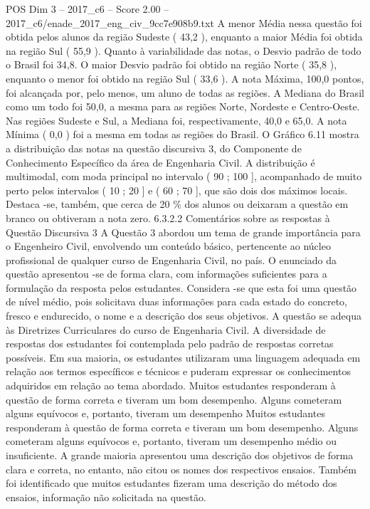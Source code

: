 \begin{textsample}{POS Dim 3 – 2017\_c6 – Score 2.00 – 2017\_c6/enade\_2017\_eng\_civ\_9cc7e908b9.txt}
A menor Média nessa questão foi obtida pelos alunos da região Sudeste ( 43,2 ), enquanto a maior Média foi obtida na região Sul ( 55,9 ).
Quanto à variabilidade das notas, o Desvio padrão de todo o Brasil foi 34,8.
O maior Desvio padrão foi obtido na região Norte ( 35,8 ), enquanto o menor foi obtido na região Sul ( 33,6 ).
A nota Máxima, 100,0 pontos, foi alcançada por, pelo menos, um aluno de todas as regiões.
A Mediana do Brasil como um todo foi 50,0, a mesma para as regiões Norte, Nordeste e Centro-Oeste.
Nas regiões Sudeste e Sul, a Mediana foi, respectivamente, 40,0 e 65,0.
A nota Mínima ( 0,0 ) foi a mesma em todas as regiões do Brasil.
O Gráfico 6.11 mostra a distribuição das notas na questão discursiva 3, do Componente de Conhecimento Específico da área de Engenharia Civil.
A distribuição é multimodal, com moda principal no intervalo ( 90 ; 100 ], acompanhado de muito perto pelos intervalos ( 10 ; 20 ] e ( 60 ; 70 ], que são dois dos máximos locais.
Destaca -se, também, que cerca de 20 \% dos alunos ou deixaram a questão em branco ou obtiveram a nota zero. 6.3.2.2 Comentários sobre as respostas à Questão Discursiva 3 A Questão 3 abordou um tema de grande importância para o Engenheiro Civil, envolvendo um conteúdo básico, pertencente ao núcleo profissional de qualquer curso de Engenharia Civil, no país.
O enunciado da questão apresentou -se de forma clara, com informações suficientes para a formulação da resposta pelos estudantes.
Considera -se que esta foi uma questão de nível médio, pois solicitava duas informações para cada estado do concreto, fresco e endurecido, o nome e a descrição dos seus objetivos.
A questão se adequa às Diretrizes Curriculares do curso de Engenharia Civil.
A diversidade de respostas dos estudantes foi contemplada pelo padrão de respostas corretas possíveis.
Em sua maioria, os estudantes utilizaram uma linguagem adequada em relação aos termos específicos e técnicos e puderam expressar os conhecimentos adquiridos em relação ao tema abordado.
Muitos estudantes responderam à questão de forma correta e tiveram um bom desempenho.
Alguns cometeram alguns equívocos e, portanto, tiveram um desempenho Muitos estudantes responderam à questão de forma correta e tiveram um bom desempenho.
Alguns cometeram alguns equívocos e, portanto, tiveram um desempenho médio ou insuficiente.
A grande maioria apresentou uma descrição dos objetivos de forma clara e correta, no entanto, não citou os nomes dos respectivos ensaios.
Também foi identificado que muitos estudantes fizeram uma descrição do método dos ensaios, informação não solicitada na questão.

\end{textsample}
